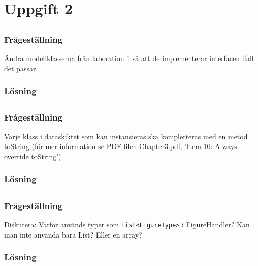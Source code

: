 %
%

\section{Uppgift 2}\label{sec:uppg2}

\subsection{}\label{sec:uppg2a}
\subsubsection*{Frågeställning}
Ändra modellklasserna från laboration 1 så att de implementerar interfacen
ifall det passar.

\subsubsection*{Lösning}


\subsection{}\label{sec:uppg2b}
\subsubsection*{Frågeställning}
Varje klass i dataskiktet som kan instansieras ska kompletteras med en metod
toString (för mer information se PDF-filen Chapter3.pdf, ’Item 10: Always
override toString’).

\subsubsection*{Lösning}


\subsection{}\label{sec:uppg2c}
\subsubsection*{Frågeställning}
Diskutera: Varför används typer som \texttt{List<FigureType>} i FigureHandler?
Kan man inte använda bara List? Eller en array?


\subsubsection*{Lösning}


